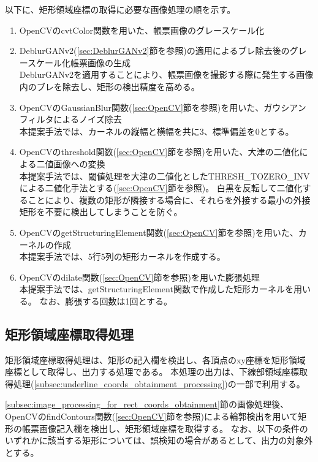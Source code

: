 以下に、矩形領域座標の取得に必要な画像処理の順を示す。

\begin{enumerate}
    \item OpenCVのcvtColor関数を用いた、帳票画像のグレースケール化
    \item DeblurGANv2(\ref{sec:DeblurGANv2}節を参照)の適用によるブレ除去後のグレースケール化帳票画像の生成\\
        DeblurGANv2を適用することにより、帳票画像を撮影する際に発生する画像内のブレを除去し、矩形の検出精度を高める。
    \item OpenCVのGaussianBlur関数(\ref{sec:OpenCV}節を参照)を用いた、ガウシアンフィルタによるノイズ除去\\
        本提案手法では、カーネルの縦幅と横幅を共に3、標準偏差を0とする。
    \item OpenCVのthreshold関数(\ref{sec:OpenCV}節を参照)を用いた、大津の二値化による二値画像への変換\\
        本提案手法では、閾値処理を大津の二値化としたTHRESH\_TOZERO\_INVによる二値化手法とする(\ref{sec:OpenCV}節を参照)。
        白黒を反転して二値化することにより、複数の矩形が隣接する場合に、それらを外接する最小の外接矩形を不要に検出してしまうことを防ぐ。
    \item OpenCVのgetStructuringElement関数(\ref{sec:OpenCV}節を参照)を用いた、カーネルの作成\\
        本提案手法では、5行5列の矩形カーネルを作成する。
    \item OpenCVのdilate関数(\ref{sec:OpenCV}節を参照)を用いた膨張処理\\
        本提案手法では、getStructuringElement関数で作成した矩形カーネルを用いる。
        なお、膨張する回数は1回とする。
\end{enumerate}


\subsection{矩形領域座標取得処理}\label{subsec:rect_coords_obtainment_processing}
矩形領域座標取得処理は、矩形の記入欄を検出し、各頂点のxy座標を矩形領域座標として取得し、出力する処理である。
本処理の出力は、下線部領域座標取得処理(\ref{subsec:underline_coords_obtainment_processing})の一部で利用する。

\ref{subsec:image_processing_for_rect_coords_obtainment}節の画像処理後、OpenCVのfindContours関数(\ref{sec:OpenCV}節を参照)による輪郭検出を用いて矩形の帳票画像記入欄を検出し、矩形領域座標を取得する。
なお、以下の条件のいずれかに該当する矩形については、誤検知の場合があるとして、出力の対象外とする。

